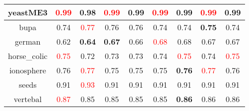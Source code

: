 \documentclass{article}%
\begin{document}
\begin{tabular}{c|cccccccc}
\hline%
yeastME3&\textcolor{red}{ 
0.99
}&0.98&\textcolor{red}{ 
0.99
}&0.99&\textcolor{red}{ 
0.99
}&0.99&\textcolor{red}{ 
0.99
}&0.99\\%
\hline%
bupa&0.74&\textcolor{red}{ 
0.77
}&0.76&0.76&0.74&0.74&\textbf{0.75}&0.74\\%
\hline%
german&0.62&\textbf{0.64}&\textbf{0.67}&0.66&\textcolor{red}{ 
0.68
}&0.68&0.67&0.67\\%
\hline%
horse\_colic&\textcolor{red}{ 
0.75
}&0.72&0.73&0.73&0.74&\textcolor{red}{ 
0.75
}&0.74&\textcolor{red}{ 
0.75
}\\%
\hline%
ionosphere&0.76&\textcolor{red}{ 
0.77
}&0.75&0.75&0.75&\textbf{0.76}&\textcolor{red}{ 
0.77
}&0.76\\%
\hline%
seeds&0.91&\textcolor{red}{ 
0.93
}&0.91&0.91&0.91&0.91&0.91&0.91\\%
\hline%
vertebal&\textcolor{red}{ 
0.87
}&0.85&0.85&0.85&0.85&\textbf{0.86}&0.86&0.86\\%
\hline%
\end{tabular}

%
\end{document}
